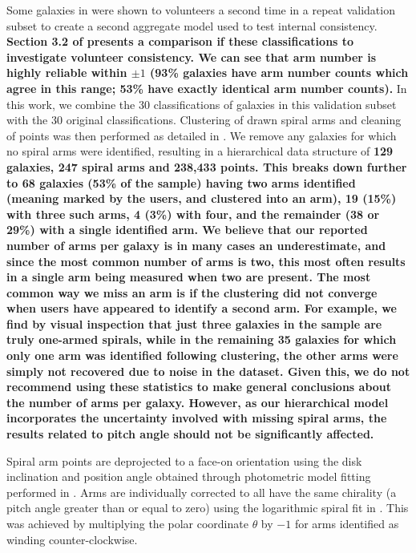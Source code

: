 Some galaxies in \citet{2020arXiv200610450L} were shown to volunteers a second time in a repeat validation subset to create a second aggregate model used to test internal consistency. {\bf Section 3.2 of \citet{2020arXiv200610450L} presents a comparison if these classifications to investigate volunteer consistency. We can see that arm number is highly reliable within $\pm1$ (93\% galaxies have arm number counts which agree in this range; 53\% have exactly identical arm number counts).} In this work, we combine the 30 classifications of galaxies in this validation subset with the 30 original classifications. Clustering of drawn spiral arms and cleaning of points was then performed as detailed in \citet{2020arXiv200610450L}. We remove any galaxies for which no spiral arms were identified, resulting in a hierarchical data structure of {\bf 129 galaxies, 247 spiral arms and 238,433 points. This breaks down further to 68 galaxies (53\% of the sample) having two arms identified (meaning marked by the users, and clustered into an arm), 19 (15\%) with three such arms, 4 (3\%) with four, and the remainder (38 or 29\%) with a single identified arm. We believe that our reported number of arms per galaxy is in many cases an underestimate, and since the most common number of arms is two, this most often results in a single arm being measured when two are present. The most common way we miss an arm is if the clustering did not converge when users have appeared to identify a second arm.
For example, we find by visual inspection that just three galaxies in the sample are truly one-armed spirals, while in the remaining 35 galaxies for which only one arm was identified following clustering, the other arms were simply not recovered due to noise in the dataset. Given this, we do not recommend using these statistics to make general conclusions about the number of arms per galaxy. However, as our hierarchical model incorporates the uncertainty involved with missing spiral arms, the results related to pitch angle should not be significantly affected.}

Spiral arm points are deprojected to a face-on orientation using the disk inclination and position angle obtained through photometric model fitting performed in \citet{2020arXiv200610450L}. Arms are individually corrected to all have the same chirality (a pitch angle greater than or equal to zero) using the logarithmic spiral fit in \citet{2020arXiv200610450L}. This was achieved by multiplying the polar coordinate $\theta$ by $-1$ for arms identified as winding counter-clockwise.

